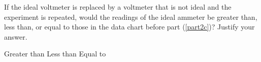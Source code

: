 \documentclass{../../oss-classkick-exam}
\begin{document}
\begin{questions}
\begin{parts}
\begin{subparts}
      \subpart If the ideal voltmeter is replaced by a voltmeter that is not
      ideal and the experiment is repeated, would the readings of the ideal
      ammeter be greater than, less than, or equal to those in the data chart
      before part (\ref{part2c})? Justify your answer.

      \vspace{.05in}
      \underline{\hspace{.4in}} Greater than\hspace{.5in}
      \underline{\hspace{.4in}} Less than\hspace{.5in}
      \underline{\hspace{.4in}} Equal to
      \vspace{.7in}
    \end{subparts}
  \end{parts}
\end{questions}
\end{document}
